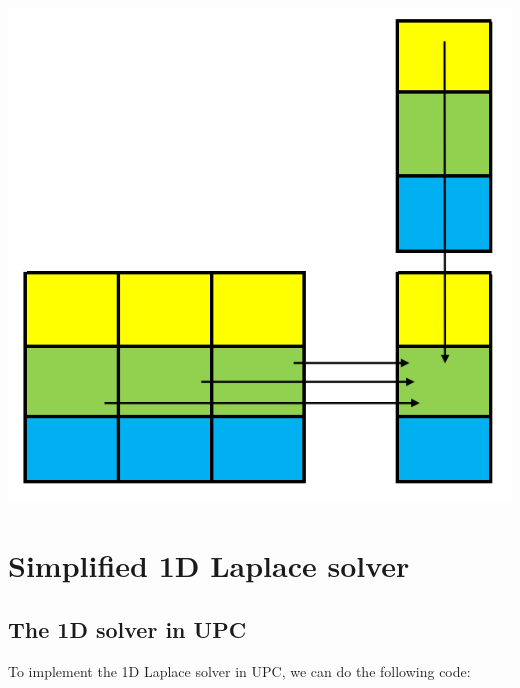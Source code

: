 \documentclass{report}
\begin{document}
\begin{center}
    \includegraphics[scale=0.5]{Images/Matrix_vector_optimized.png}
    \label{fig2}
\end{center}

\chapter{Simplified 1D Laplace solver}

\section{The 1D solver in UPC}

To implement the 1D Laplace solver in UPC, we can do the following code:
\end{document}
